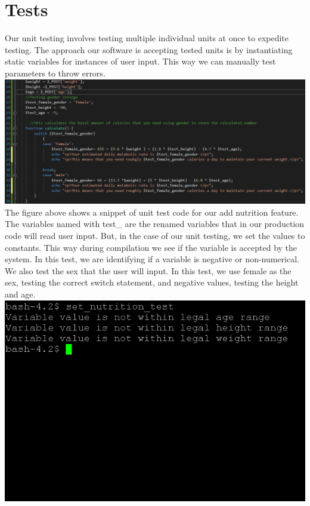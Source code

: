 \documentclass[a4paper]{article}
\begin{document}
\section{Tests}
Our unit testing involves testing multiple individual units at once to expedite testing. The approach our software is accepting tested units is by instantiating static variables for instances of user input. This way we can manually test parameters to throw errors. 
\newline
\newline
\includegraphics[width=\textwidth]{test1.PNG}
\newline
\newline
The figure above shows a snippet of unit test code for our add nutrition feature. The variables named with test\_ are the renamed variables that in our production code will read user input. But, in the case of our unit testing, we set the values to constants. This way during compilation we see if the variable is accepted by the system. In this test, we are identifying if a variable is negative or non-numerical. We also test the sex that the user will input. In this test, we use female as the sex, testing the correct switch statement, and negative values, testing the height and age.
\newline
\newline
\includegraphics[width=\textwidth]{test5.PNG}
\end{document}
